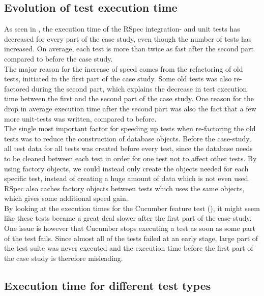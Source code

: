 
\subsection{Evolution of test execution time}

As seen in , the execution time of the RSpec
integration- and unit tests has decreased for every part of the case
study, even though the number of tests has increased. On average, each
test is more than twice as fast after the second part compared to before
the case study.\\

The major reason for the increase of speed comes from the refactoring of
old tests, initiated in the first part of the case study. Some old tests
was also re-factored during the second part, which explains the decrease
in test execution time between the first and the second part of the case
study. One reason for the drop in average execution time after the
second part was also the fact that a few more unit-tests was written,
compared to before.\\

The single most important factor for speeding up tests when re-factoring
the old tests was to reduce the construction of database objects. Before
the case-study, all test data for all tests was created before every
test, since the database needs to be cleaned between each test in order
for one test not to affect other tests. By using factory objects, we
could instead only create the objects needed for each specific test,
instead of creating a huge amount of data which is not even used. RSpec
also caches factory objects between tests which uses the same objects,
which gives some additional speed gain.\\

By looking at the execution times for the Cucumber feature test
(), it might seem like these tests became a
great deal slower after the first part of the case-study. One issue is
however that Cucumber stops executing a test as soon as some part of the
test fails. Since almost all of the tests failed at an early stage,
large part of the test suite was never executed and the execution time
before the first part of the case study is therefore misleading.\\


\subsection{Execution time for different test types}

